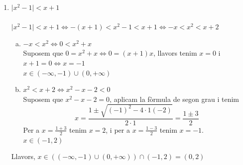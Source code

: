 \begin{enumerate}[1)]
\item $\vert x^2-1 \vert <x+1$ \\ \\
$\vert x^2-1 \vert <x+1 \Longleftrightarrow -(x+1)<x^2-1<x+1 \Longleftrightarrow -x<x^2<x+2$ 
\begin{enumerate}[a)]
\item $-x<x^2 \Longleftrightarrow 0<x^2+x$ \\
Suposem que $0=x^2+x \Longleftrightarrow 0=(x+1)x$, llavors tenim $x=0$ i $x+1=0 \Longleftrightarrow x=-1$ \\
$x\in (-\infty, -1)\cup(0,+\infty)$
\item $x^2<x+2 \Longleftrightarrow x^2-x-2<0$ \\
Suposem que $x^2-x-2=0$, aplicam la fòrmula de segon grau i tenim \begin{equation*}
x = \frac{1 \pm \sqrt{(-1)^2- 4\cdot 1(-2)}}
{2\cdot 1} = \frac{1 \pm 3}{2} 
\end{equation*}
Per a $x=\frac{1+3}{2}$ tenim $x=2$, i per a $x=\frac{1-3}{2}$ tenim $x=-1$. \\
$x\in (-1, 2)$ 
\end{enumerate}
Llavors, $x\in ((-\infty, -1)\cup(0,+\infty))\cap (-1, 2)= (0, 2)$\\
\end{enumerate}